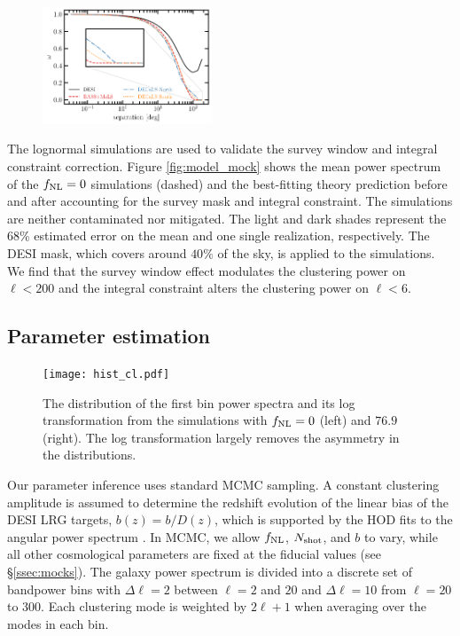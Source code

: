 \begin{figure}
    \centering
    \includegraphics[width=0.45\textwidth]{figures/mask_2pf.pdf}
    \caption{}
    \label{fig:mask2pf}
\end{figure}



The lognormal simulations are used to validate the survey window and integral constraint correction. Figure \ref{fig:model_mock} shows the mean power spectrum of the $f_{\rm NL}=0$ simulations (dashed) and the best-fitting theory prediction before and after accounting for the survey mask and integral constraint. The simulations are neither contaminated nor mitigated. The light and dark shades represent the 68\% estimated error on the mean and one single realization, respectively. The DESI mask, which covers around $40\%$ of the sky, is applied to the simulations. We find that the survey window effect modulates the clustering power on $\ell < 200$ and the integral constraint alters the clustering power on $\ell < 6$.

\subsection{Parameter estimation}

\begin{figure}
\centering
\texttt{[image: hist\_cl.pdf]}
\caption{The distribution of the first bin power spectra and its log transformation from the simulations with $f_{\rm NL}=0$ (left) and $76.9$ (right). The log transformation largely removes the asymmetry in the distributions.}\label{fig:histcell}
\end{figure}

Our parameter inference uses standard MCMC sampling. A constant clustering amplitude is assumed to determine the redshift evolution of the linear bias of the DESI LRG targets, $b(z) = b/D(z)$, which is supported by the HOD fits to the angular power spectrum \citep{zhou2021clustering}. In MCMC, we allow $f_{\rm NL}$, $N_{\rm shot}$, and $b$ to vary, while all other cosmological parameters are fixed at the fiducial values (see \S \ref{ssec:mocks}). The galaxy power spectrum is divided into a discrete set of bandpower bins with $\Delta\ell=2$ between $\ell=2$ and $20$ and $\Delta \ell=10$ from $\ell=20$ to $300$. Each clustering mode is weighted by $2\ell+1$ when averaging over the modes in each bin.

